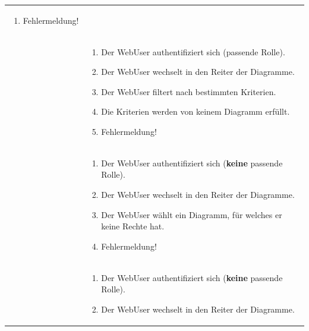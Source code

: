 \begin{longtable}[c]{|p{4cm}|p{10cm}|}
\begin{enumerate}
        \item Fehlermeldung!
    \end{enumerate}                                                                                                                               \\\cline{2-2} &
    \begin{enumerate} %
        \item Der WebUser authentifiziert sich (passende Rolle).
        \item Der WebUser wechselt in den Reiter der Diagramme.
        \item Der WebUser filtert nach bestimmten Kriterien.
        \item Die Kriterien werden von keinem Diagramm erfüllt.
        \item Fehlermeldung!
    \end{enumerate}                                                                                                                               \\\cline{2-2} &
    \begin{enumerate} %
        \item Der WebUser authentifiziert sich (\textbf{keine} passende Rolle).
        \item Der WebUser wechselt in den Reiter der Diagramme.
        \item Der WebUser wählt ein Diagramm, für welches er keine Rechte hat.
        \item Fehlermeldung!
    \end{enumerate}                                                                                                                               \\\cline{2-2} &
    \begin{enumerate} %
        \item Der WebUser authentifiziert sich (\textbf{keine} passende Rolle).
        \item Der WebUser wechselt in den Reiter der Diagramme.

\end{enumerate}
\end{longtable}
